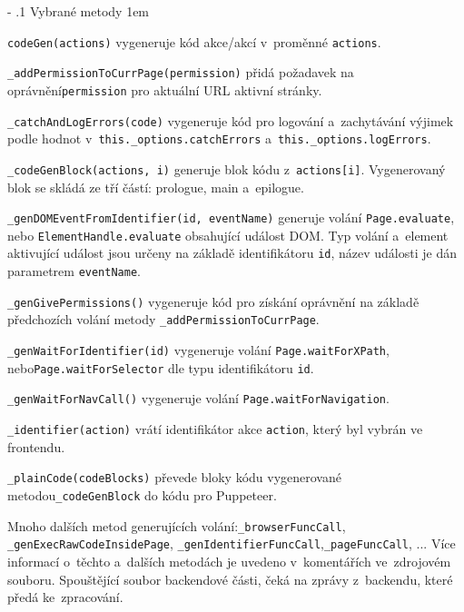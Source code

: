 \documentclass[12pt, a4paper, twoside]{article}
\makeatletter
\newcommand\subsubsubsection{\@startsection{paragraph}{4}{\z@}{-2.5ex\@plus -1ex \@minus -.25ex}{1.25ex \@plus .25ex}{\normalfont\normalsize\bfseries}}
\newenvironment{methods}{
	\parindent0pt
	\parskip1em
	\vspace{-0.8em}
}{}
\renewcommand\paragraph{%
	\@startsection{subparagraph}{5}{0mm}%
	{-\baselineskip}%
	{.1\baselineskip}%
	{\normalfont\normalsize\bfseries}}
\makeatother
\begin{document}
	\paragraph{Vybrané metody}
	\begin{methods}
		\lstinline|codeGen(actions)| vygeneruje kód akce/akcí v~proměnné \lstinline|actions|.
		
		\lstinline|_addPermissionToCurrPage(permission)| přidá požadavek na oprávnění\newline\lstinline|permission| pro aktuální URL aktivní stránky.
		
		\lstinline|_catchAndLogErrors(code)| vygeneruje kód pro logování a~zachytávání výjimek podle hodnot v~\lstinline|this._options.catchErrors| a~\lstinline|this._options.logErrors|.
		
		\lstinline|_codeGenBlock(actions, i)| generuje blok kódu z~\lstinline|actions[i]|. Vygenerovaný blok se skládá ze tří částí: prologue, main a~epilogue.
		
		\lstinline|_genDOMEventFromIdentifier(id, eventName)| generuje volání \lstinline|Page.evaluate|, nebo \lstinline|ElementHandle.evaluate| obsahující událost DOM. Typ volání a~element aktivující událost jsou určeny na základě identifikátoru \lstinline|id|, název události je dán parametrem \lstinline|eventName|.
		
		\lstinline|_genGivePermissions()| vygeneruje kód pro získání oprávnění na základě předchozích volání metody \lstinline|_addPermissionToCurrPage|.
		
		\lstinline|_genWaitForIdentifier(id)| vygeneruje volání \lstinline|Page.waitForXPath|, nebo\newline\lstinline|Page.waitForSelector| dle typu identifikátoru \lstinline|id|.
		
		\lstinline|_genWaitForNavCall()| vygeneruje volání \lstinline|Page.waitForNavigation|.
		
		\lstinline|_identifier(action)| vrátí identifikátor akce \lstinline|action|, který byl vybrán ve frontendu.
		
		\lstinline|_plainCode(codeBlocks)| převede bloky kódu vygenerované metodou\newline\lstinline|_codeGenBlock| do kódu pro Puppeteer.
		
		Mnoho dalších metod generujících volání:\newline \lstinline|_browserFuncCall|, \lstinline|_genExecRawCodeInsidePage|, \lstinline|_genIdentifierFuncCall|,\linebreak\lstinline|_pageFuncCall|, ... Více informací o~těchto a~dalších metodách je uvedeno v~komentářích ve~zdrojovém souboru.
	\end{methods}
	\subsubsubsection{main.js}
	Spouštějící soubor backendové části, čeká na zprávy z~backendu, které předá ke~zpracování.
\end{document}
